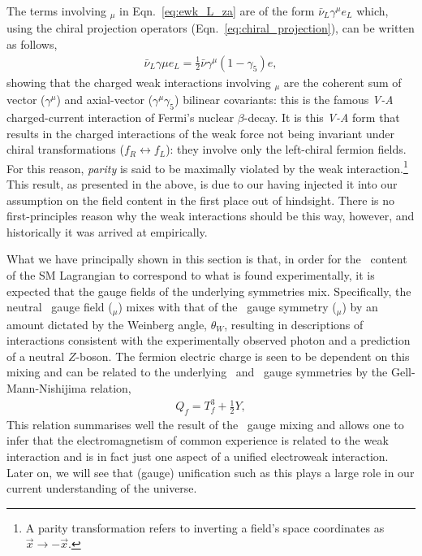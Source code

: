 The terms involving \fieldWpm$_{\mu}$ in Eqn.~\ref{eq:ewk_L_za} are
of the form $\bar{\nu}_L \gamma^{\mu} e_L$
which, using the chiral projection operators (Eqn.~\ref{eq:chiral_projection}), can be
written as follows,
\begin{align}
	\bar{\nu}_L \gamma{\mu} e_L = \frac{1}{2} \bar{\nu} \gamma^{\mu}(1-\gamma_5) e,
	\label{eq:v_minus_a}
\end{align}
showing that the charged weak interactions involving \fieldWpm$_{\mu}$ are the coherent
sum of vector ($\gamma^{\mu}$) and axial-vector ($\gamma^{\mu}\gamma_5$) bilinear covariants: this is the famous
\textit{V-A} charged-current interaction of Fermi's nuclear $\beta$-decay.
It is this \textit{V-A} form that results in the charged interactions of the weak force
not being invariant under chiral transformations ($f_R \leftrightarrow f_L$): they involve only
the left-chiral fermion fields. For this reason, \textit{parity}
is said to be maximally violated by the weak interaction.\footnote{A parity transformation
	refers to inverting a field's space coordinates as $\vec{x} \rightarrow -\vec{x}$.}
This result, as presented in the above, is due to our having injected
it into our assumption on the field content in the first place out of hindsight. There
is no first-principles reason why the weak interactions should be this way, however,
and historically it was arrived at empirically.

What we have principally shown in this section is that, in order for the \SUewk~content of
the SM Lagrangian to correspond to what is found experimentally, it is expected that
the gauge fields of the underlying symmetries mix. Specifically, the neutral \SUtwo~gauge field
(\fieldWzero$_{\mu}$) mixes with that of the \Uone~gauge symmetry (\fieldB$_{\mu}$) by an amount
dictated by the Weinberg angle, $\theta_W$, resulting in descriptions of interactions consistent
with the experimentally observed photon and a prediction of a neutral $Z$-boson. 
The fermion electric charge is seen to be dependent on this mixing
and can be related to the underlying \SUtwo~and \Uone~gauge symmetries by the
Gell-Mann-Nishijima relation,
\begin{align}
	Q_f = T_f^3 + \frac{1}{2}Y,
	\label{eq:gell_mann_nishijima}
\end{align}
This relation summarises well the result of the \SUewk~gauge mixing and allows one to
infer that the electromagnetism of common experience
is related to the weak interaction and is in fact just one aspect of a unified electroweak interaction.
Later on, we will see that (gauge) unification such as this plays a large role in our
current understanding of the universe.

